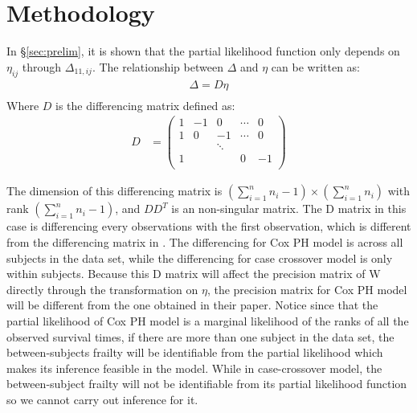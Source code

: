 \documentclass[]{article}
\begin{document}
\section{Methodology}\label{sec:method}

In \S\ref{sec:prelim}, it is shown that the partial likelihood function only depends on $\eta_{ij}$ through $\Delta_{11,ij}$. The relationship between $\Delta$ and $\eta$ can be written as:
\begin{equation}\begin{aligned}\label{eqn:D1}
\Delta  = D\eta \\
\end{aligned}\end{equation}
Where $D$ is the differencing matrix defined as:
\begin{equation}\begin{aligned}\label{eqn:D2}
D &= \begin{pmatrix}
1 & -1 & 0 & \cdots & 0 \\
1 & 0 & -1 & \cdots & 0 \\
  &    & \ddots &   &   \\
1 &    &       & 0 & -1 \\
\end{pmatrix}
\end{aligned}\end{equation}

The dimension of this differencing matrix is $(\sum_{i=1}^{n} n_i -1) \times (\sum_{i=1}^{n} n_i )$ with rank $(\sum_{i=1}^{n} n_i -1)$, and $DD^T$ is an non-singular matrix. The D matrix in this case is differencing every observations with the first observation, which is different from the differencing matrix in \citet{casecross}. The differencing for Cox PH model is across all subjects in the data set, while the differencing for case crossover model is only within subjects. Because this D matrix will affect the precision matrix of W directly through the transformation on $\eta$, the precision matrix for Cox PH model will be different from the one \citet{casecross} obtained in their paper. Notice since that the partial likelihood of Cox PH model is a marginal likelihood of the ranks of all the observed survival times, if there are more than one subject in the data set, the between-subjects frailty will be identifiable from the partial likelihood which makes its inference feasible in the model. While in case-crossover model, the between-subject frailty will not be identifiable from its partial likelihood function so we cannot carry out inference for it.
\end{document}
